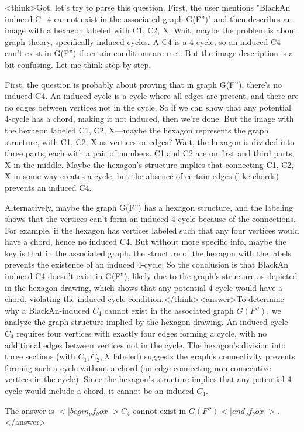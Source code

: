 <think>Got, let's try to parse this question. First, the user mentions "BlackAn induced C_4 cannot exist in the associated graph G(F'')" and then describes an image with a hexagon labeled with C1, C2, X. Wait, maybe the problem is about graph theory, specifically induced cycles. A C4 is a 4-cycle, so an induced C4 can't exist in G(F'') if certain conditions are met. But the image description is a bit confusing. Let me think step by step.

First, the question is probably about proving that in graph G(F''), there's no induced C4. An induced cycle is a cycle where all edges are present, and there are no edges between vertices not in the cycle. So if we can show that any potential 4-cycle has a chord, making it not induced, then we're done. But the image with the hexagon labeled C1, C2, X—maybe the hexagon represents the graph structure, with C1, C2, X as vertices or edges? Wait, the hexagon is divided into three parts, each with a pair of numbers. C1 and C2 are on first and third parts, X in the middle. Maybe the hexagon's structure implies that connecting C1, C2, X in some way creates a cycle, but the absence of certain edges (like chords) prevents an induced C4.

Alternatively, maybe the graph G(F'') has a hexagon structure, and the labeling shows that the vertices can't form an induced 4-cycle because of the connections. For example, if the hexagon has vertices labeled such that any four vertices would have a chord, hence no induced C4. But without more specific info, maybe the key is that in the associated graph, the structure of the hexagon with the labels prevents the existence of an induced 4-cycle. So the conclusion is that BlackAn induced C4 doesn't exist in G(F''), likely due to the graph's structure as depicted in the hexagon drawing, which shows that any potential 4-cycle would have a chord, violating the induced cycle condition.</think><answer>To determine why a BlackAn-induced \( C_4 \) cannot exist in the associated graph \( G(F'') \), we analyze the graph structure implied by the hexagon drawing. An induced cycle \( C_4 \) requires four vertices with exactly four edges forming a cycle, with no additional edges between vertices not in the cycle. The hexagon’s division into three sections (with \( C_1, C_2, X \) labeled) suggests the graph’s connectivity prevents forming such a cycle without a chord (an edge connecting non-consecutive vertices in the cycle). Since the hexagon’s structure implies that any potential 4-cycle would include a chord, it cannot be an induced \( C_4 \).  

The answer is \(<|begin_of_box|>C_4 \text{ cannot exist in } G(F'')<|end_of_box|>\).</answer>